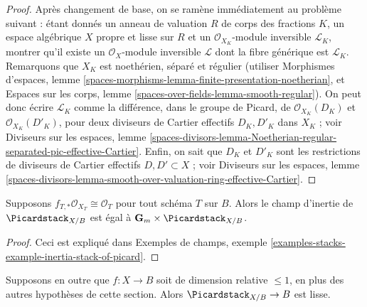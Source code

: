 \begin{proof}
Après changement de base, on se ramène immédiatement au problème suivant :
étant donnés un anneau de valuation $R$ de corps des fractions $K$, un
espace algébrique $X$ propre et lisse sur $R$ et un
$\mathcal{O}_{X_K}$-module inversible $\mathcal{L}_K$, montrer qu'il existe
un $\mathcal{O}_X$-module inversible $\mathcal{L}$ dont la fibre générique
est $\mathcal{L}_K$.
Remarquons que $X_K$ est noethérien, séparé et régulier (utiliser Morphismes
d'espaces, lemme
\ref{spaces-morphisms-lemma-finite-presentation-noetherian}, et Espaces sur
les corps, lemme \ref{spaces-over-fields-lemma-smooth-regular}).
On peut donc écrire $\mathcal{L}_K$ comme la différence, dans le groupe de
Picard, de $\mathcal{O}_{X_K}(D_K)$ et
$\mathcal{O}_{X_K}(D'_K)$, pour deux diviseurs de Cartier effectifs
$D_K, D'_K$ dans $X_K$ ; voir Diviseurs sur les espaces, lemme
\ref{spaces-divisors-lemma-Noetherian-regular-separated-pic-effective-Cartier}.
Enfin, on sait que $D_K$ et $D'_K$ sont les restrictions de diviseurs de
Cartier effectifs $D, D' \subset X$ ; voir Diviseurs sur les espaces,
lemme
\ref{spaces-divisors-lemma-smooth-over-valuation-ring-effective-Cartier}.
\end{proof}

\begin{lemma}
\label{lemma-pic-inertia}
Supposons $f_{T, *}\mathcal{O}_{X_T} \cong \mathcal{O}_T$ pour tout schéma
$T$ sur $B$. Alors le champ d'inertie de $\Picardstack_{X/B}$ est égal à
$\mathbf{G}_m \times \Picardstack_{X/B}$.
\end{lemma}

\begin{proof}
Ceci est expliqué dans Exemples de champs, exemple
\ref{examples-stacks-example-inertia-stack-of-picard}.
\end{proof}

\begin{lemma}
\label{lemma-pic-curves-smooth}
Supposons en outre que $f : X \to B$ soit de dimension relative
$\leq 1$, en plus des autres hypothèses de cette section. Alors
$\Picardstack_{X/B} \to B$ est lisse.
\end{lemma}

